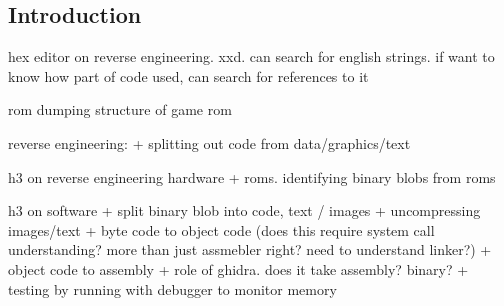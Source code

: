 
\subsection{Introduction}

hex editor on reverse engineering. xxd. can search for english strings. if want to know how part of code used, can search for references to it

rom dumping
structure of game rom

reverse engineering:
+ splitting out code from data/graphics/text

h3 on reverse engineering hardware
+ roms. identifying binary blobs from roms

h3 on software
+ split binary blob into code, text / images
+ uncompressing images/text
+ byte code to object code (does this require system call understanding? more than just assmebler right? need to understand linker?)
+ object code to assembly
+ role of ghidra. does it take assembly? binary?
+ testing by running with debugger to monitor memory



